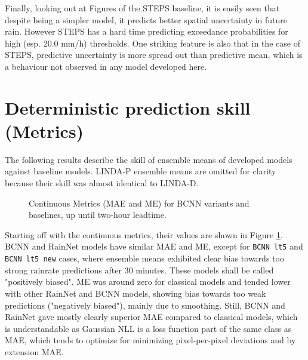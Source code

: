 Finally, looking out at Figures of the STEPS baseline, it is easily seen that despite being a simpler model, it predicts better spatial uncertainty in future rain. However STEPS has a hard time predicting exceedance probabilities for high (esp. 20.0 mm/h) thresholds. One striking feature is also that in the case of STEPS, predictive uncertainty is more spread out than predictive mean, which is a behaviour not observed in any model developed here. 


\section{Deterministic prediction skill (Metrics)}

The following results describe the skill of ensemble means of developed models against baseline models. LINDA-P ensemble means are omitted for clarity because their skill was almost identical to LINDA-D. 

\begin{figure}[H]
	\centering

	\caption{Continuous Metrics (MAE and ME) for BCNN variants and baselines, up until two-hour leadtime.}
	\label{fig:cont-metrics}
\end{figure}

Starting off with the continuous metrics, their values are shown in Figure \ref{fig:cont-metrics}. BCNN and RainNet models have similar MAE and ME, except for \texttt{BCNN lt5} and \texttt{BCNN lt5 new} cases, where ensemble means exhibited clear bias towards too strong rainrate predictions after 30 minutes. These models shall be called "positively biased". ME was around zero for classical models and tended lower with other RainNet and BCNN models, showing bias towards too weak predictions ("negatively biased"), mainly due to smoothing. Still, BCNN and RainNet gave mostly clearly superior MAE compared to classical models, which is understandable as Gaussian NLL is a loss function part of the same class as MAE, which tends to optimize for minimizing pixel-per-pixel deviations and by extension MAE. 

